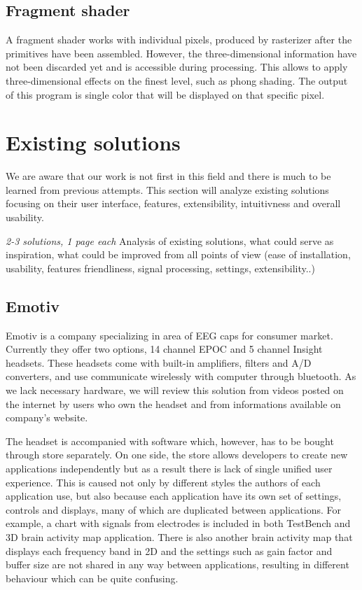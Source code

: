 \subsection{Fragment shader}
A fragment shader works with individual pixels, produced by rasterizer after the
primitives have been assembled. However, the three-dimensional information have
not been discarded yet and is accessible during processing. This allows to apply
three-dimensional effects on the finest level, such as phong shading. The output
of this program is single color that will be displayed on that specific pixel.

\section{Existing solutions}
We are aware that our work is not first in this field and there is much to be
learned from previous attempts. This section will analyze existing solutions
focusing on their user interface, features, extensibility, intuitivness and
overall usability.

\emph{2-3 solutions, 1 page each}
Analysis of existing solutions, what could serve as inspiration, what could be
improved from all points of view (ease of installation, usability, features
friendliness, signal processing, settings, extensibility..)
\subsection{Emotiv}
Emotiv is a company specializing in area of EEG caps for consumer market.
Currently they offer two options, 14 channel EPOC and 5 channel Insight
headsets. These headsets come with built-in amplifiers, filters and A/D
converters, and use communicate wirelessly with computer through bluetooth. As
we lack necessary hardware, we will review this solution from videos posted on
the internet by users who own the headset and from informations available on
company's website.

The headset is accompanied with software which, however, has to be bought
through store separately. On one side, the store allows developers to create new
applications independently but as a result there is lack of single unified user
experience. This is caused not only by different styles the authors of each
application use, but also because each application have its own set of settings,
controls and displays, many of which are duplicated between applications. For
example, a chart with signals from electrodes is included in both TestBench and
3D brain activity map application. There is also another brain activity map that
displays each frequency band in 2D and the settings such as gain factor and
buffer size are not shared in any way between applications, resulting in
different behaviour which can be quite confusing.

